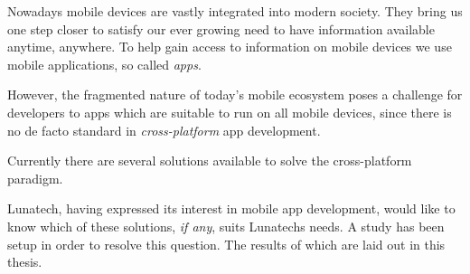 \samenvatting



Nowadays mobile devices are vastly integrated into modern society. They bring us one step closer to satisfy our ever growing need to have information available anytime, anywhere. To help gain access to information on mobile devices we use mobile applications, so called \emph{apps}. 

However, the fragmented nature of today's mobile ecosystem poses a challenge for developers to apps which are suitable to run on all mobile devices, since there is no de facto standard in \emph{cross-platform} app development.

Currently there are several solutions available to solve the cross-platform paradigm.

Lunatech, having expressed its interest in mobile app development, would like to know which of these solutions, \emph{if any}, suits Lunatechs needs. A study has been setup in order to resolve this question. The results of which are laid out in this thesis.